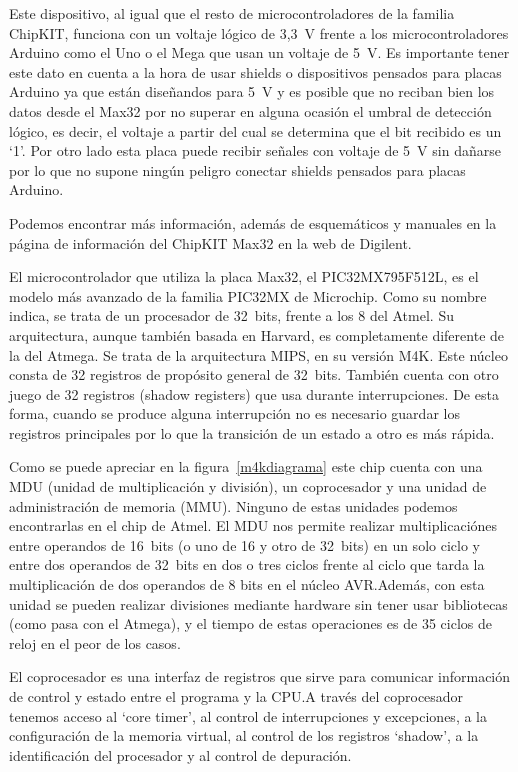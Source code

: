 Este dispositivo, al igual que el resto de microcontroladores de la familia ChipKIT, funciona con un voltaje lógico de 3,3~V frente a los microcontroladores Arduino como el Uno o el Mega que usan un voltaje de 5~V. Es importante tener este dato en cuenta a la hora de usar shields o dispositivos pensados para placas Arduino ya que están diseñandos para 5~V y es posible que no reciban bien los datos desde el Max32 por no superar en alguna ocasión el umbral de detección lógico, es decir, el voltaje a partir del cual se determina que el bit recibido es un `1'. Por otro lado esta placa puede recibir señales con voltaje de 5~V sin dañarse por lo que no supone ningún peligro conectar shields pensados para placas Arduino.

Podemos encontrar más información, además de esquemáticos y manuales en la página de información del ChipKIT Max32 en la web de Digilent.\cite{website:max32}

El microcontrolador que utiliza la placa Max32, el PIC32MX795F512L, es el modelo más avanzado de la familia PIC32MX de Microchip. Como su nombre indica, se trata de un procesador de 32~bits, frente a los 8 del Atmel. Su arquitectura, aunque también basada en Harvard, es completamente diferente de la del Atmega. Se trata de la arquitectura MIPS, en su versión M4K. Este núcleo consta de 32 registros de propósito general de 32~bits. También cuenta con otro juego de 32 registros (shadow registers) que usa durante interrupciones. De esta forma, cuando se produce alguna interrupción no es necesario guardar los registros principales por lo que la transición de un estado a otro es más rápida.


Como se puede apreciar en la figura~\ref{m4kdiagrama} este chip cuenta con una MDU (unidad de multiplicación y división), un coprocesador y una unidad de administración de memoria (MMU). Ninguno de estas unidades podemos encontrarlas en el chip de Atmel. El MDU nos permite realizar multiplicaciónes entre operandos de 16~bits (o uno de 16 y otro de 32~bits) en un solo ciclo y entre dos operandos de 32~bits en dos o tres ciclos frente al ciclo que tarda la multiplicación de dos operandos de 8 bits en el núcleo AVR.\@ Además, con esta unidad se pueden realizar divisiones mediante hardware sin tener usar bibliotecas (como pasa con el Atmega), y el tiempo de estas operaciones es de 35 ciclos de reloj en el peor de los casos.

El coprocesador es una interfaz de registros que sirve para comunicar información de control y estado entre el programa y la CPU.\@ A través del coprocesador tenemos acceso al `core timer', al control de interrupciones y excepciones, a la configuración de la memoria virtual, al control de los registros `shadow', a la identificación del procesador y al control de depuración.

